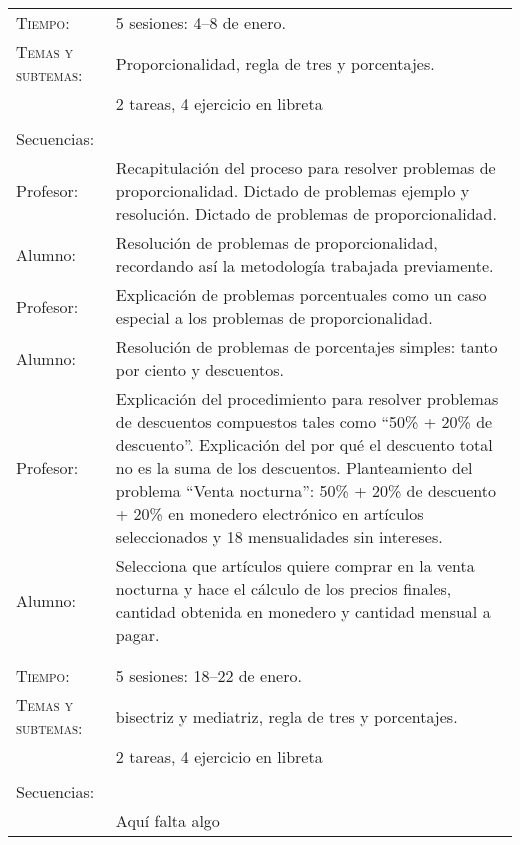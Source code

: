 \documentclass[letterpaper,10pt]{article}
\begin{document}
\begin{tabular}[t]{R{0.25\textwidth}p{0.71\textwidth}}
    \textsc{Tiempo:}                    & 5 sesiones: 4--8  de enero. \\
    \textsc{Temas y subtemas:}          & Proporcionalidad, regla de tres y porcentajes.\\
              & 2 tareas, 4 ejercicio en libreta\\ \\
    \large{\sc Secuencias:} \\
    Profesor:   & Recapitulaci\'on del proceso para resolver problemas de proporcionalidad. Dictado de problemas ejemplo y resoluci\'on. Dictado de problemas de proporcionalidad.\\
    Alumno:     & Resoluci\'on de problemas de proporcionalidad, recordando as\'i la metodolog\'ia trabajada previamente.  \\
    Profesor:   & Explicaci\'on de problemas porcentuales como un caso especial a los problemas de proporcionalidad. \\
    Alumno:     & Resoluci\'on de problemas de porcentajes simples: tanto por ciento y descuentos. \\
    Profesor:   & Explicaci\'on del procedimiento para resolver problemas de descuentos compuestos tales como ``50\% + 20\% de descuento''. Explicaci\'on del por qu\'e el descuento total no es la suma de los descuentos. Planteamiento del problema ``Venta nocturna'': 50\% + 20\% de descuento + 20\% en monedero electr\'onico en art\'iculos seleccionados y 18 mensualidades sin intereses. \\
    Alumno:     & Selecciona que art\'iculos quiere comprar en la venta nocturna y hace el c\'alculo de los precios finales, cantidad obtenida en monedero y cantidad mensual a pagar. \\
\\ \hline \\
    \textsc{Tiempo:}                    & 5 sesiones: 18--22  de enero. \\
    \textsc{Temas y subtemas:}          & bisectriz y mediatriz, regla de tres y porcentajes.\\
              & 2 tareas, 4 ejercicio en libreta\\ \\
    \large{\sc Secuencias:} \\

                    & {\Huge Aqu\'i falta algo}
\end{tabular}
\end{document}
